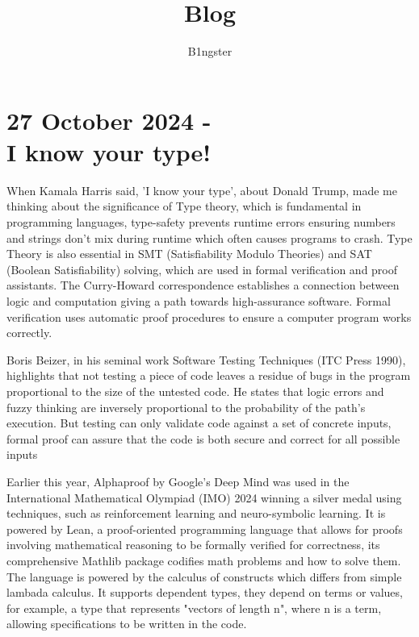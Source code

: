 \documentclass{article}
\title{Blog}
\author{B1ngster}
\date{}
\begin{document}
\maketitle
\newpage
 
\section*{27 October 2024 - \\ I know your type! }

When Kamala Harris said, 'I know your type', about Donald Trump, made me thinking about the significance of Type theory, which is fundamental in programming languages, type-safety prevents runtime errors ensuring numbers and strings don't mix during runtime which often causes programs to crash. Type Theory is also essential in SMT (Satisfiability Modulo Theories) and SAT (Boolean Satisfiability) solving, which are used in formal verification and proof assistants.  The Curry-Howard correspondence establishes a connection between logic and computation giving a path towards high-assurance software. Formal verification uses automatic proof procedures to ensure a computer program works correctly. 

Boris Beizer, in his seminal work Software Testing Techniques (ITC Press 1990), highlights that not testing a piece of code leaves a residue of bugs in the program proportional to the size of the untested code. He states that logic errors and fuzzy thinking are inversely proportional to the probability of the path’s execution. But testing can only validate code against a set of concrete inputs, formal proof can assure that the code is both secure and correct for all possible inputs

Earlier this year, Alphaproof by Google's Deep Mind was used in the International Mathematical Olympiad (IMO) 2024 winning a silver medal using techniques, such as reinforcement learning and neuro-symbolic learning.  It is powered by Lean, a proof-oriented programming language that allows for proofs involving mathematical reasoning to be formally verified for correctness, its comprehensive Mathlib package codifies math problems and how to solve them. The language is powered by the calculus of constructs which differs from simple lambada calculus. It supports dependent types, they depend on terms or values, for example, a type that represents "vectors of length n", where n is a term, allowing specifications to be written in the code. 
\end{document}
